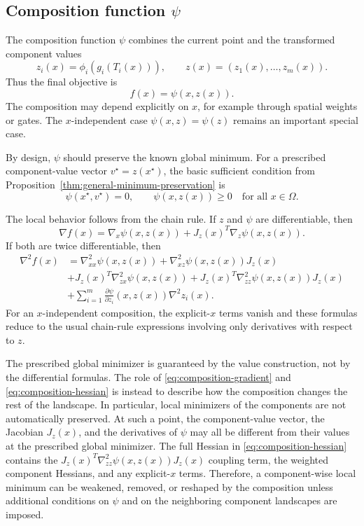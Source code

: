 \documentclass[journal]{IEEEtran}
\theoremstyle{remark}
\theoremstyle{plain}
\begin{document}
\subsection{\texorpdfstring{Composition function \(\psi\)}{Composition function psi}}
\label{subsec:composition-function}

The composition function \(\psi\) combines the current point and the transformed
component values
\[
	z_i(x)=\phi_i(g_i(T_i(x))),
	\qquad
	z(x)=(z_1(x),\ldots,z_m(x)).
\]
Thus the final objective is
\[
	f(x)=\psi(x,z(x)).
\]
The composition may depend explicitly on \(x\), for example through spatial
weights or gates. The \(x\)-independent case \(\psi(x,z)=\psi(z)\) remains an
important special case.

By design, \(\psi\) should preserve the known global minimum. For a prescribed
component-value vector \(v^\star=z(x^\star)\), the basic sufficient condition
from Proposition~\ref{thm:general-minimum-preservation} is
\[
	\psi(x^\star,v^\star)=0,
	\qquad
	\psi(x,z(x))\ge0
	\quad\text{for all }x\in\Omega.
\]

The local behavior follows from the chain rule. If \(z\) and \(\psi\) are
differentiable, then
\begin{equation}
	\nabla f(x)
	=
	\nabla_x\psi(x,z(x))
	+
	J_z(x)^T\nabla_z\psi(x,z(x)).
	\label{eq:composition-gradient}
\end{equation}
If both are twice differentiable, then
\begin{align}
	\nabla^2 f(x)
	&={}
	\nabla_{xx}^2\psi(x,z(x))
	+
	\nabla_{xz}^2\psi(x,z(x))J_z(x)
	\nonumber\\
	&+
	J_z(x)^T\nabla_{zx}^2\psi(x,z(x))
	+
	J_z(x)^T\nabla_{zz}^2\psi(x,z(x))J_z(x)
	\nonumber\\
	&+
	\sum_{i=1}^m
	\frac{\partial\psi}{\partial z_i}(x,z(x))\nabla^2 z_i(x).
	\label{eq:composition-hessian}
\end{align}
For an \(x\)-independent composition, the explicit-\(x\) terms vanish and
these formulas reduce to the usual chain-rule expressions involving only
derivatives with respect to \(z\).

The prescribed global minimizer is guaranteed by the value construction, not by
the differential formulas. The role of
\eqref{eq:composition-gradient} and \eqref{eq:composition-hessian} is instead
to describe how the composition changes the rest of the landscape. In
particular, local minimizers of the components are not automatically preserved.
At such a point, the component-value vector, the Jacobian \(J_z(x)\), and the
derivatives of \(\psi\) may all be different from their values at the prescribed
global minimizer. The full Hessian in
\eqref{eq:composition-hessian} contains the
\(J_z(x)^T\nabla_{zz}^2\psi(x,z(x))J_z(x)\) coupling term, the weighted
component Hessians, and any explicit-\(x\) terms. Therefore, a component-wise
local minimum can be weakened, removed, or reshaped by the composition unless
additional conditions on \(\psi\) and on the neighboring component landscapes
are imposed.
\end{document}
